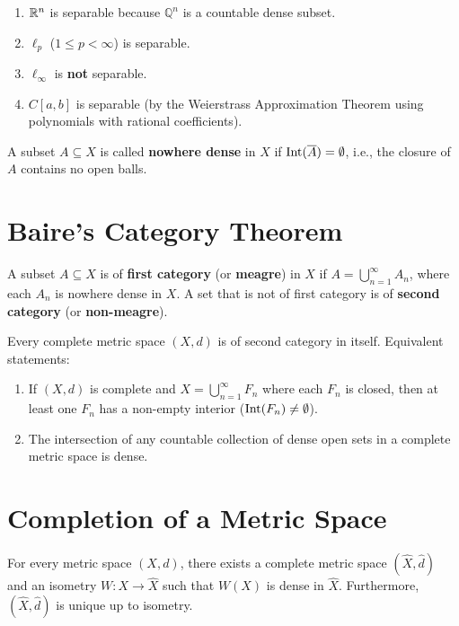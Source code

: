 \begin{theorem}
\begin{enumerate}[label=\rm{(\roman*)}]
    \item $\mathbb{R}^n$ is separable because $\mathbb{Q}^n$ is a countable dense subset.
    \item $\ell_p$ ($1 \le p < \infty$) is separable.
    \item $\ell_\infty$ is \textbf{not} separable.
    \item $C[a,b]$ is separable (by the Weierstrass Approximation Theorem using polynomials with rational coefficients).
\end{enumerate}
\end{theorem}

\begin{definition}
A subset $A \subseteq X$ is called \textbf{nowhere dense} in $X$ if $\operatorname{Int}(\overline{A}) = \emptyset$, i.e., the closure of $A$ contains no open balls.
\end{definition}


\section{Baire's Category Theorem}
\label{sec:baire_category}

\begin{definition}
A subset $A \subseteq X$ is of \textbf{first category} (or \textbf{meagre}) in $X$ if $A = \bigcup_{n=1}^\infty A_n$, where each $A_n$ is nowhere dense in $X$. A set that is not of first category is of \textbf{second category} (or \textbf{non-meagre}).
\end{definition}

\begin{theorem}
Every complete metric space $(X,d)$ is of second category in itself. Equivalent statements:
\begin{enumerate}[label=\rm{(\roman*)}]
    \item If $(X,d)$ is complete and $X = \bigcup_{n=1}^\infty F_n$ where each $F_n$ is closed, then at least one $F_n$ has a non-empty interior ($\operatorname{Int}(F_n) \neq \emptyset$).
    \item The intersection of any countable collection of dense open sets in a complete metric space is dense.
\end{enumerate}
\end{theorem}


\section{Completion of a Metric Space}
\label{sec:completion}

\begin{theorem}
For every metric space $(X,d)$, there exists a complete metric space $(\widehat{X}, \widehat{d})$ and an isometry $W: X \to \widehat{X}$ such that $W(X)$ is dense in $\widehat{X}$. Furthermore, $(\widehat{X}, \widehat{d})$ is unique up to isometry.
\end{theorem}
